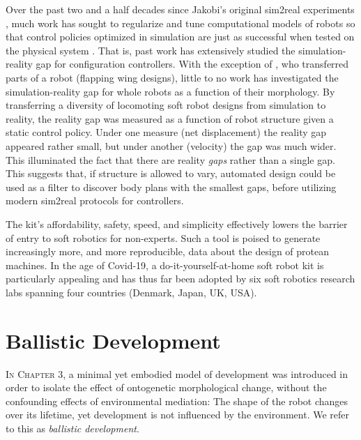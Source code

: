 Over the past two and a half decades since Jakobi's original sim2real experiments \cite{jakobi1995noise},
much work has sought to regularize and tune computational models of robots
so that control policies optimized in simulation are just as successful when tested on the physical system \cite{bongard2006resilient,koos2012transferability,cully2015robots,tan2018sim,pmlr-v87-golemo18a,tobin2018domain,chebotar2019closing,hwangbo2019learning,kwiatkowski2019task,nachum2019multi,akkaya2019solving}.
That is, past work has extensively studied the simulation-reality gap for configuration controllers.
With the exception of \citet{rosser2019sim2real}, who transferred parts of a robot (flapping wing designs),
little to no work has investigated the simulation-reality gap for whole robots as a function of their morphology.
By transferring a diversity of locomoting soft robot designs from simulation to reality, the reality gap was measured as a function of robot structure given a static control policy.
Under one measure (net displacement) the reality gap appeared rather small, but under another (velocity) the gap was much wider.
This illuminated the fact that there are reality \textit{gaps} rather than a single gap.
This suggests that, if structure is allowed to vary, automated design could be used as a filter to discover body plans with the smallest gaps, before utilizing modern sim2real protocols for controllers.

The kit's affordability, safety, speed, and simplicity effectively lowers the barrier of entry to soft robotics for non-experts.
Such a tool is poised to generate increasingly more, and more reproducible, data about the design of protean machines.
In the age of Covid-19, a do-it-yourself-at-home soft robot kit 
is particularly appealing and has thus far been adopted by six soft robotics research labs spanning four countries (Denmark, Japan, UK, USA).


\section{Ballistic Development}


\textsc{In Chapter 3,}
a minimal yet embodied model of development was introduced in order to isolate the effect of ontogenetic morphological change,
without the confounding effects of environmental mediation:
The shape of the
robot changes over its lifetime, yet development is not influenced
by the environment.
We refer to this as \textit{ballistic development}.


